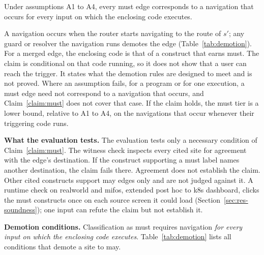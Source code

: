 \begin{claim}
\label{claim:must}
Under assumptions A1 to A4, every must edge corresponds to a navigation that occurs for every
input on which the enclosing code executes.
\end{claim}

\noindent A navigation occurs when the router starts navigating to the route of $s'$; any guard or
resolver the navigation runs demotes the edge (Table~\ref{tab:demotion}). For a merged edge, the enclosing code is that
of a construct that earns must. The claim is conditional on that code running, so it does not show
that a user can reach the trigger. It states what the demotion rules are designed to meet and is not
proved. Where an assumption fails, for a program or for one
execution, a must edge need not correspond to a navigation that occurs, and
Claim~\ref{claim:must} does not cover that case. If the claim holds, the must tier is a lower bound, relative
to A1 to A4, on the navigations that occur whenever their triggering code runs.

\textbf{What the evaluation tests.} The evaluation tests only a necessary condition of
Claim~\ref{claim:must}. The witness check
inspects every cited site for agreement with the
edge's destination. If the construct supporting a must label names another destination,
the claim fails there. Agreement does not establish the claim. Other cited constructs
support may edges only and are not judged against it. A runtime check on realworld and mifos, extended post hoc to k8s dashboard, clicks the must
constructs once on each source screen it could load (Section~\ref{sec:res-soundness}); one input
can refute the claim but not establish it.

\textbf{Demotion conditions.} Classification as must requires navigation \emph{for every input
on which the enclosing code executes}. Table~\ref{tab:demotion} lists all conditions that
demote a site to may.

